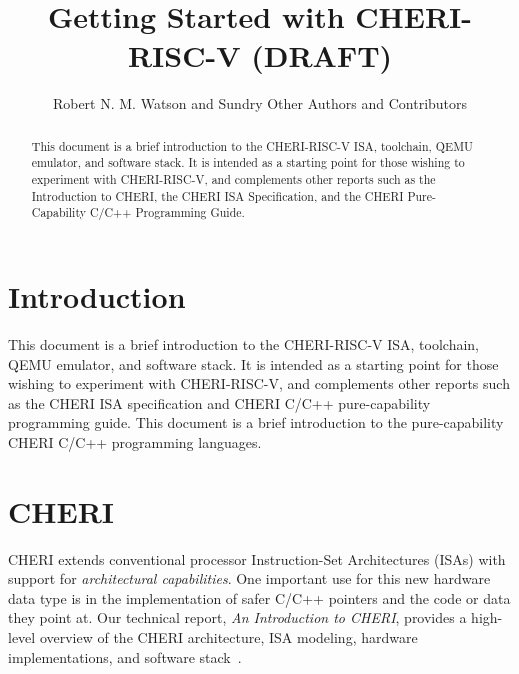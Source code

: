 \documentclass[12pt,twoside,openright,a4paper]{article}
\title{Getting Started with CHERI-RISC-V (DRAFT)}
\author{Robert N. M. Watson and Sundry Other Authors and Contributors}
\begin{document}
\sloppy

\maketitle


%
%
\begin{abstract}
This document is a brief introduction to the CHERI-RISC-V ISA, toolchain,
QEMU emulator, and software stack.
It is intended as a starting point for those wishing to experiment with
CHERI-RISC-V, and complements other reports such as the Introduction to CHERI,
the CHERI ISA Specification, and the CHERI Pure-Capability C/C++ Programming
Guide.
\end{abstract}

\newpage
\setcounter{tocdepth}{2}
\tableofcontents

\newpage

\section{Introduction}

%
%
This document is a brief introduction to the CHERI-RISC-V ISA, toolchain,
QEMU emulator, and software stack.
It is intended as a starting point for those wishing to experiment with
CHERI-RISC-V, and complements other reports such as the CHERI ISA
specification and CHERI C/C++ pure-capability programming guide.
This document is a brief introduction to the pure-capability CHERI C/C++
programming languages.

\section{CHERI}

CHERI extends conventional processor Instruction-Set Architectures (ISAs) with
support for \textit{architectural capabilities}.
One important use for this new hardware data type is in the implementation
of safer C/C++ pointers and the code or data they point at.
Our technical report, \textit{An Introduction to CHERI}, provides a high-level
overview of the CHERI architecture, ISA modeling, hardware implementations,
and software stack~\cite{UCAM-CL-TR-941}.
\end{document}
